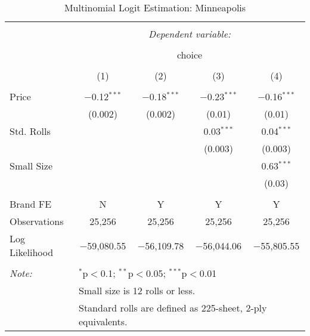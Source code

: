 
\begin{table}[!htbp] \centering 
  \caption{Multinomial Logit Estimation: Minneapolis} 
  \label{tab:mnlMinneapolisBaseline} 
\begin{tabular}{@{\extracolsep{5pt}}lcccc} 
\\[-1.8ex]\hline 
\hline \\[-1.8ex] 
 & \multicolumn{4}{c}{\textit{Dependent variable:}} \\ 
\cline{2-5} 
\\[-1.8ex] & \multicolumn{4}{c}{choice} \\ 
\\[-1.8ex] & (1) & (2) & (3) & (4)\\ 
\hline \\[-1.8ex] 
 Price & $-$0.12$^{***}$ & $-$0.18$^{***}$ & $-$0.23$^{***}$ & $-$0.16$^{***}$ \\ 
  & (0.002) & (0.002) & (0.01) & (0.01) \\ 
  Std. Rolls &  &  & 0.03$^{***}$ & 0.04$^{***}$ \\ 
  &  &  & (0.003) & (0.003) \\ 
  Small Size &  &  &  & 0.63$^{***}$ \\ 
  &  &  &  & (0.03) \\ 
 \hline \\[-1.8ex] 
Brand FE & N & Y & Y & Y \\ 
Observations & 25,256 & 25,256 & 25,256 & 25,256 \\ 
Log Likelihood & $-$59,080.55 & $-$56,109.78 & $-$56,044.06 & $-$55,805.55 \\ 
\hline 
\hline \\[-1.8ex] 
\textit{Note:}  & \multicolumn{4}{l}{$^{*}$p$<$0.1; $^{**}$p$<$0.05; $^{***}$p$<$0.01} \\ 
 & \multicolumn{4}{l}{Small size is 12 rolls or less.} \\ 
 & \multicolumn{4}{l}{Standard rolls are defined as 225-sheet, 2-ply equivalents.} \\ 
\end{tabular} 
\end{table} 
